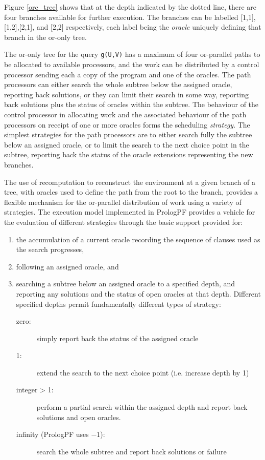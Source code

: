 Figure \ref{orc_tree} shows that at the depth indicated by the dotted line, there are
four branches available for further execution.  The branches can be labelled
[1,1], [1,2],[2,1], and [2,2] respectively, each label being the \textit{oracle}
uniquely defining that branch in the or-only tree.

The or-only tree for the query \texttt{g(U,V)} has a maximum of four or-parallel paths
to be allocated to available processors, and the work can be distributed by a control
processor sending each a copy of the program and one of the oracles.  The path processors
can either search the whole subtree below the assigned oracle, reporting back solutions,
or they can limit their search in some way, reporting back solutions plus the status
of oracles within the subtree.  The behaviour of the control processor in allocating
work and the associated behaviour of the path processors on receipt of one or more
oracles forms the scheduling \textit{strategy}.  The simplest strategies for the path
processors are to either search fully the subtree below an assigned oracle, or to
limit the search to the next choice point in the subtree, reporting back the status of
the oracle extensions representing the new branches.

The use of recomputation to reconstruct the environment at a given branch of a tree,
with oracles used to define the path from the root to the branch, provides a 
flexible mechanism for the or-parallel distribution of work using a variety of
strategies.  The execution model implemented in PrologPF provides a vehicle for the
evaluation of different strategies through the basic support provided for:
\begin{enumerate}
\item{the accumulation of a current oracle recording the sequence of clauses used as
  the search progresses,}
\item{following an assigned oracle, and}
\item{searching a subtree below an assigned oracle to a specified depth, and
  reporting any solutions and the status of open oracles at that depth.  Different
  specified depths permit fundamentally different types of strategy:
  \begin{description}
  \item[zero:]{ simply report back the status of the assigned oracle}
  \item[1:]{ extend the search to the next choice point (i.e. increase depth by 1)}
  \item[integer > 1:]{ perform a partial search within the assigned depth
    and report back solutions and open
    oracles.}
  \item[infinity (PrologPF uses $-1$):]{ search the whole subtree and report back
    solutions or failure}
  \end{description}}
\end{enumerate}

